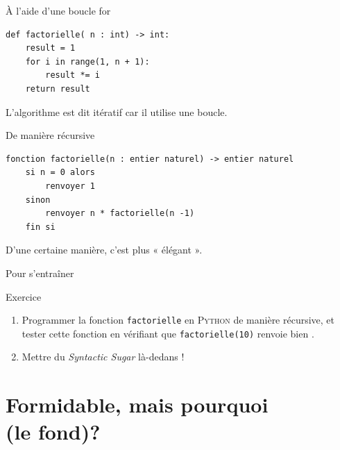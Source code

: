 \documentclass[10pt]{beamer}
\begin{document}
\begin{frame}[fragile]{À l'aide d'une boucle for}
\begin{verbatim}
def factorielle( n : int) -> int:
    result = 1
    for i in range(1, n + 1):
        result *= i
    return result
\end{verbatim}
\pause
L'algorithme est dit \alert{itératif} car il utilise une boucle.
\end{frame}


\begin{frame}[fragile]{De manière récursive}
\begin{verbatim}
fonction factorielle(n : entier naturel) -> entier naturel
    si n = 0 alors
        renvoyer 1
    sinon
        renvoyer n * factorielle(n -1)
    fin si
\end{verbatim}

\pause
D'une certaine manière, c'est plus « élégant ».
\end{frame}



\begin{frame}{Pour s'entraîner}

\begin{alertblock}{Exercice}
\begin{enumerate}[\bfseries 1.]
	\item 	Programmer la fonction \texttt{factorielle} en \textsc{Python} de manière récursive, et tester cette fonction en vérifiant que  \texttt{factorielle(10)} renvoie bien .
    \item   Mettre du \textit{Syntactic Sugar} là-dedans !
\end{enumerate}
\end{alertblock}
\end{frame}




\section{Formidable, mais pourquoi\\ (le fond)?}
\end{document}
